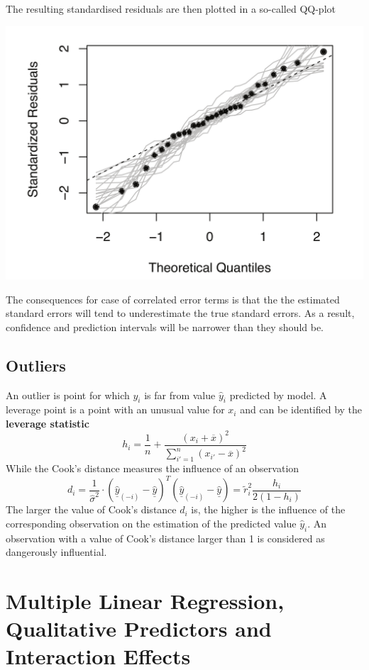 \documentclass[11pt]{article}
\newcommand*\samplemean[1]{\overline{#1}}
\begin{document}
The resulting standardised residuals are then plotted in a so-called QQ-plot
\begin{center}
	\includegraphics[width=0.5\linewidth]{img/QQ_plot}
\end{center}
\begin{theorem}
	The consequences for case of correlated error terms is that the  the estimated standard errors will tend to underestimate the true standard errors. As a result, confidence and prediction intervals will be narrower than they should be.
\end{theorem}

\subsection{Outliers}
An outlier is point for which $y_i$ is far from value $\hat{y}_i$ predicted by model. A leverage point is a point with an unusual value for $x_i$ and can be identified by the \textbf{leverage statistic}
\begin{equation*}
	h_i = \frac{1}{n} + \frac{(x_i + \samplemean{x})^2}{\sum_{i' = 1}^{n}(x_{i'}-\samplemean{x})^2}
\end{equation*}
While the Cook's distance measures the influence of an observation
\begin{equation*}
	d_i = \frac{1}{\hat{\sigma}^2}\cdot\left(\underline{\hat{y}}_{(-i)} - \underline{\hat{y}}\right)^T \left(\underline{\hat{y}}_{(-i)} - \underline{\hat{y}}\right) = \tilde{r}_i^2 \frac{h_i}{2(1-h_i)}
\end{equation*}
The larger the value of Cook’s distance $d_i$ is, the higher is the influence of the corresponding observation on the estimation of the predicted value $\hat{y}_i$. An observation with a value of Cook’s distance larger than 1 is considered as dangerously influential.

\section{Multiple Linear Regression, Qualitative Predictors and Interaction Effects}
\end{document}
